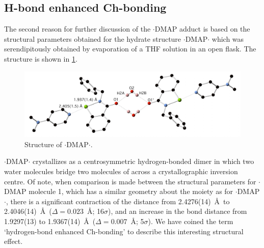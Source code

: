 \begin{refsection}
    \subsection{H-bond enhanced Ch-bonding}
    The second reason for further discussion of the $ \cdot $DMAP adduct is based on the structural parameters obtained for the hydrate structure $ \cdot $DMAP$ \cdot $ which was serendipitously obtained by evaporation of a THF solution in an open flask.
    The structure is shown in \cref{fig:benzyl-dmap-hydrate}.
    
    \begin{figure}
      \centering
      \includegraphics[width=0.8\linewidth]{Figures/benzyl-dmap-hydrate.pdf}
      \caption{Structure of $ \cdot $DMAP$ \cdot $.}\label{fig:benzyl-dmap-hydrate}
    \end{figure}
    
    $ \cdot $DMAP$ \cdot $ crystallizes as a centrosymmetric hydrogen-bonded dimer in which two water molecules bridge two molecules of  across a crystallographic inversion centre.
    Of note, when comparison is made between the structural parameters for $ \cdot $DMAP molecule 1, which has a similar geometry about the  moiety as for $ \cdot $DMAP$ \cdot $, there is a significant contraction of the  distance from 2.4276(14)~\AA\ to 2.4046(14)~\AA\ ($ \Delta =0.023$~\AA{}; 16$ \sigma $), and an increase in the  bond distance from 1.9297(13) to 1.9367(14)~\AA\ ($ \Delta =0.007$~\AA{}; 5$ \sigma $).
    We have coined the term `hydrogen-bond enhanced Ch-bonding' to describe this interesting structural effect.
    

\end{refsection}
